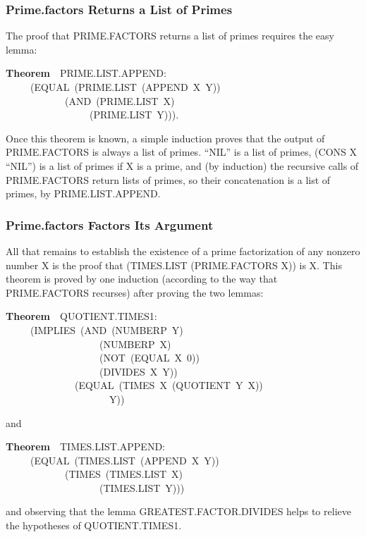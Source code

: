 \documentclass[10pt]{book}
\newenvironment{pubasis}{\begin{flushleft}}{\end{flushleft}}
\newcommand{\axiomordefinition}[1]{\vspace{6pt}\Large\textsf{\textbf{#1}}\normalsize}
\begin{document}
\subsubsection{Prime.factors Returns a List of Primes}
The proof that PRIME.FACTORS returns a list of primes
requires the easy lemma:

\begin{pubasis}
\axiomordefinition{Theorem}~~PRIME.LIST.APPEND:\\
~~~~~(EQUAL~(PRIME.LIST~(APPEND~X~Y))\\
~~~~~~~~~~~~(AND~(PRIME.LIST~X)\\
~~~~~~~~~~~~~~~~~(PRIME.LIST~Y))).\\
\end{pubasis}
Once this theorem is known, a simple induction
proves that the output
of PRIME.FACTORS is always a list of primes. 
``NIL'' is a list of primes, (CONS X ``NIL'') is
a list of primes if X is a prime,  and (by induction) the
recursive calls of PRIME.FACTORS return lists
of primes, so their concatenation is a list
of primes, by PRIME.LIST.APPEND.
\subsubsection{Prime.factors Factors Its Argument}
All that remains to establish the existence of a prime factorization
of any nonzero number X is
the proof that (TIMES.LIST (PRIME.FACTORS X))
is X.  This theorem is proved by one induction
(according to the way that PRIME.FACTORS recurses)
after  proving  the two lemmas:

\begin{pubasis}
\axiomordefinition{Theorem}~~QUOTIENT.TIMES1:\\
~~~~~(IMPLIES~(AND~(NUMBERP~Y)\\
~~~~~~~~~~~~~~~~~~~(NUMBERP~X)\\
~~~~~~~~~~~~~~~~~~~(NOT~(EQUAL~X~0))\\
~~~~~~~~~~~~~~~~~~~(DIVIDES~X~Y))\\
~~~~~~~~~~~~~~(EQUAL~(TIMES~X~(QUOTIENT~Y~X))\\
~~~~~~~~~~~~~~~~~~~~~Y))\\
\end{pubasis}
and
\begin{pubasis}
\axiomordefinition{Theorem}~~TIMES.LIST.APPEND:\\
~~~~~(EQUAL~(TIMES.LIST~(APPEND~X~Y))\\
~~~~~~~~~~~~(TIMES~(TIMES.LIST~X)\\
~~~~~~~~~~~~~~~~~~~(TIMES.LIST~Y)))\\
\end{pubasis}
and observing that the lemma GREATEST.FACTOR.DIVIDES
helps to relieve the hypotheses of QUOTIENT.TIMES1.
\end{document}
